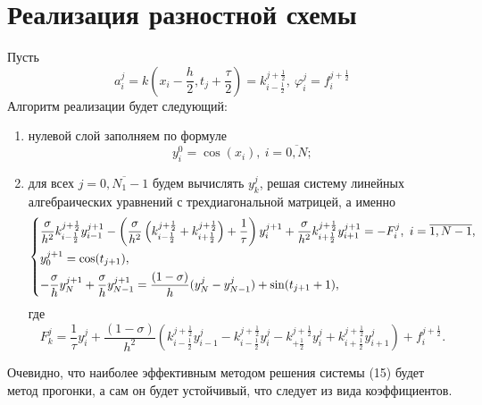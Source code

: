 \documentclass[a4paper, 12pt]{article}
\begin{document}
\section*{Реализация разностной схемы}
Пусть $$a_i^j = k\left(x_i - \dfrac h 2, t_j + \dfrac \tau 2\right) = k_{i-\frac 12}^{j + \frac 12},\ \varphi_i^j = f_i^{j + \frac 12}$$
Алгоритм реализации будет следующий:
\begin{enumerate}
	\item нулевой слой заполняем по формуле \begin{equation}
		y_i^0 = \cos(x_i),\ i = \overline {0,N};
	\end{equation}
	\item для всех $j = \overline {0, N_1-1}$ будем вычислять $y_k^j$, решая систему линейных алгебраических уравнений с трехдиагональной матрицей, а именно
	\begin{equation}
		\begin{dcases}
			\dfrac{\sigma}{h^2}k_{i-\frac 12}^{j+\frac 12}y_{i-1}^{j+1} - \left(\dfrac{\sigma}{h^2}\left(k_{i-\frac 12}^{j + \frac 12} + k_{i + \frac 12}^{j + \frac 12}\right) + \dfrac 1 \tau\right) y_i^{j+1} + \dfrac {\sigma}{h^2}k_{i+\frac 12}^{j+\frac 12} y_{i+1}^{j+1} = - F_i^j,\ i = \overline {1, N-1},\\
			y_0^{j+1} = \cos (t_{j+1}),\\ 
			-\dfrac \sigma h y_N^{j+1} + \dfrac \sigma h y_{N-1}^{j+1} = \dfrac{(1-\sigma)}{h}(y_N^j - y_{N-1}^j) + \sin(t_{j+1} + 1),
		\end{dcases}
	\end{equation}
	где $$F_k^j = \dfrac 1 \tau y_i^j + \dfrac{(1-\sigma)}{h^2}(k_{i-\frac 12}^{j+\frac 12} y_{i-1}^j - k_{i-\frac 12}^{j+\frac 12} y_i^j- k_{+\frac 12}^{j+\frac 12} y_i^j + k_{i+\frac12}^{j+\frac12}y_{i+1}^j) + f_i^{j+\frac 12}.$$
\end{enumerate}
Очевидно, что наиболее эффективным методом решения системы (15) будет метод прогонки, а сам он будет устойчивый, что следует из вида коэффициентов.
\end{document}
